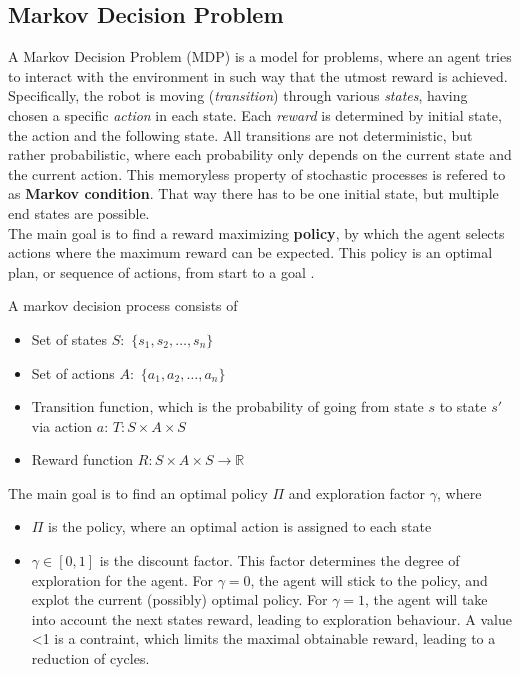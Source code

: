 \documentclass[a4paper]{article}
\begin{document}
\subsection{Markov Decision Problem}
	A Markov Decision Problem (MDP) is a model for problems, where an agent tries to interact with the environment in such way that the utmost reward is achieved. Specifically, the robot is moving (\textit{transition}) through various \textit{states}, having chosen a specific \textit{action} in each state. Each \textit{reward} is determined by initial state, the action and the following state. 
	All transitions are not deterministic, but rather probabilistic, where each probability only depends on the current state and the current action. This memoryless property of stochastic processes is refered to as \textbf{Markov condition}. That way there has to be one initial state, but multiple end states are possible.\\
	The main goal is to find a reward maximizing \textbf{policy}, by which the agent selects actions where the maximum reward can be expected. This policy is an optimal plan, or sequence of actions, from start to a goal \citep{Lecture}.
	\par A markov decision process consists of
	\begin{itemize}
		\item Set of states $S:$ $\{s_1,s_2,\dots, s_n\}$
		\item Set of actions $A:$  $\{a_1,a_2,\dots, a_n\}$ 
		\item Transition function, which is the probability of going from state $s$ to state $s'$ via action $a$: $T: S\times A \times S$
		\item  Reward function $R: S\times A \times S \rightarrow \mathbb{R}$
	\end{itemize}
	The main goal is to find an optimal policy $\Pi$ and exploration factor $\gamma$, where
	\begin{itemize}
		\item $\Pi$ is the policy, where an optimal action is assigned to each state
		\item $\gamma \in [0,1]$ is the discount factor. This factor determines the degree of exploration for the agent. For $\gamma=0$, the agent will stick to the policy, and explot the current (possibly) optimal policy. For $\gamma=1$, the agent will take into account the next states reward, leading to exploration behaviour. A value <1 is a contraint, which limits the maximal obtainable reward, leading to a reduction of cycles.
	\end{itemize}
\end{document}

